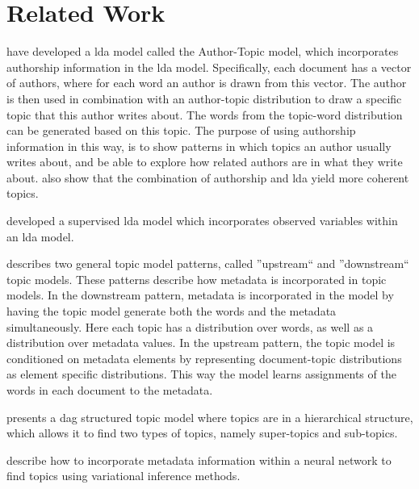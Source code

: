 \section{Related Work}

\citet{author_topic_2012} have developed a \gls{lda} model called the Author-Topic model, which incorporates authorship information in the \gls{lda} model.
Specifically, each document has a vector of authors, where for each word an author is drawn from this vector.
The author is then used in combination with an author-topic distribution to draw a specific topic that this author writes about.
The words from the topic-word distribution can be generated based on this topic.
The purpose of using authorship information in this way, is to show patterns in which topics an author usually writes about, and be able to explore how related authors are in what they write about.
\citeauthor{author_topic_2012} also show that the combination of authorship and \gls{lda} yield more coherent topics.

\citet{blei2010supervised} developed a supervised \gls{lda} model which incorporates observed variables within an \gls{lda} model.


\citet{mimno2008topic} describes two general topic model patterns, called ''upstream`` and ''downstream`` topic models.
These patterns describe how metadata is incorporated in topic models.
In the downstream pattern, metadata is incorporated in the model by having the topic model generate both the words and the metadata simultaneously.
Here each topic has a distribution over words, as well as a distribution over metadata values.
In the upstream pattern, the topic model is conditioned on metadata elements by representing document-topic distributions as element specific distributions.
This way the model learns assignments of the words in each document to the metadata.

\citet{li2006pachinko} presents a \gls{dag} structured topic model where topics are in a hierarchical structure, which allows it to find two types of topics, namely super-topics and sub-topics. 


\citet{card2017neural} describe how to incorporate metadata information within a neural network to find topics using variational inference methods.

